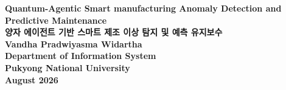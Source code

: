 \begin{titlepage}
    \centering
    {\Huge \textbf{Quantum-Agentic Smart manufacturing Anomaly Detection and Predictive Maintenance}}\\[1cm]
    {\Large \textbf{양자 에이전트 기반 스마트 제조 이상 탐지 및 예측 유지보수}}\\[2cm]
    \textbf{Vandha Pradwiyasma Widartha}\\
    \textbf{Department of Information System }\\
    \textbf{Pukyong National University}\\
    \textbf{August 2026}
\end{titlepage}